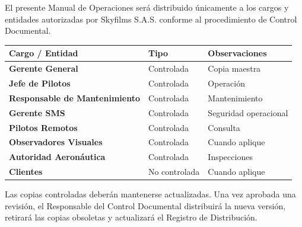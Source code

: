 

El presente Manual de Operaciones será distribuido únicamente a los cargos y entidades autorizadas por Skyfilms S.A.S. conforme al procedimiento de Control Documental.

\vspace{0.3cm}

\renewcommand{\arraystretch}{1.1}
\setlength{\tabcolsep}{5pt}

\begin{table}[H]
\centering

\begin{tabularx}{\textwidth}{
>{\bfseries}l
>{\centering\arraybackslash}p{2.6cm}
X}

\toprule

Cargo / Entidad &
Tipo &
Observaciones

\\

\midrule

Gerente General &
Controlada &
Copia maestra

\\

Jefe de Pilotos &
Controlada &
Operación

\\

Responsable de Mantenimiento &
Controlada &
Mantenimiento

\\

Gerente SMS &
Controlada &
Seguridad operacional

\\

Pilotos Remotos &
Controlada &
Consulta

\\

Observadores Visuales &
Controlada &
Cuando aplique

\\

Autoridad Aeronáutica &
Controlada &
Inspecciones

\\

Clientes &
No controlada &
Cuando aplique

\\

\bottomrule

\end{tabularx}

\end{table}

\vspace{0.3cm}

\begin{tcolorbox}[
colback=gray!5,
colframe=black,
title=Control de Distribución]

Las copias controladas deberán mantenerse actualizadas. Una vez aprobada una revisión, el Responsable del Control Documental distribuirá la nueva versión, retirará las copias obsoletas y actualizará el Registro de Distribución.

\end{tcolorbox}